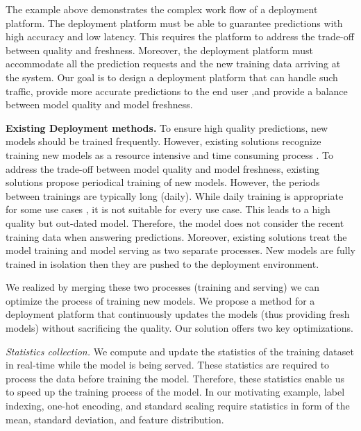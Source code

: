 The example above demonstrates the complex work flow of a deployment platform.
The deployment platform must be able to guarantee predictions with high accuracy and low latency.
This requires the platform to address the trade-off between quality and freshness.
Moreover, the deployment platform must accommodate all the prediction requests and the new training data arriving at the system. 
Our goal is to design a deployment platform that can handle such traffic, provide more accurate predictions to the end user ,and provide a balance between model quality and model freshness.

\textbf{Existing Deployment methods.} 
To ensure high quality predictions, new models should be trained frequently.
However, existing solutions recognize training new models as a resource intensive and time consuming process \cite{crankshaw2014missing, agarwal2014laser, baylor2017tfx}.
To address the trade-off between model quality and model freshness, existing solutions propose periodical training of new models.
However, the periods between trainings are typically long (daily).
While daily training is appropriate for some use cases \cite{baylor2017tfx}, it is not suitable for every use case.
This leads to a high quality but out-dated model.
Therefore, the model does not consider the recent training data when answering predictions.
Moreover, existing solutions treat the model training and model serving as two separate processes. 
New models are fully trained in isolation then they are pushed to the deployment environment.

We realized by merging these two processes (training and serving) we can optimize the process of training new models.
We propose a method for a deployment platform that continuously updates the models (thus providing fresh models) without sacrificing the quality.
Our solution offers two key optimizations.

\textit{Statistics collection.} 
We compute and update the statistics of the training dataset in real-time while the model is being served. 
These statistics are required to process the data before training the model.
Therefore, these statistics enable us to speed up the training process of the model.
In our motivating example, label indexing, one-hot encoding, 
and standard scaling require statistics in form of the mean, standard deviation, and feature distribution.

